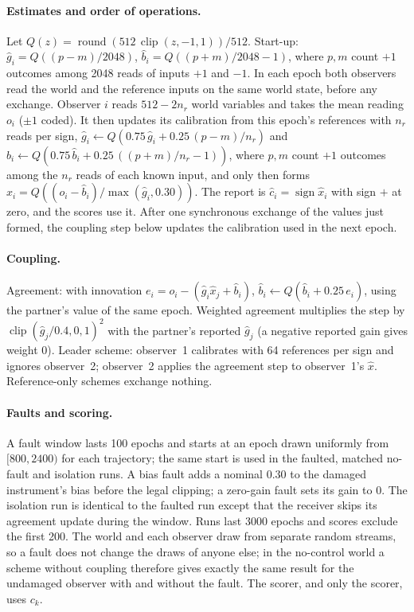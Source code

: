 \paragraph{Estimates and order of operations.} Let $Q(z)=\operatorname{round}(512\,\operatorname{clip}(z,-1,1))/512$. Start-up: $\hat g_i=Q((p-m)/2048)$, $\hat b_i=Q((p+m)/2048-1)$, where $p,m$ count $+1$ outcomes among 2048 reads of inputs $+1$ and $-1$. In each epoch both observers read the world and the reference inputs on the same world state, before any exchange. Observer $i$ reads $512-2n_r$ world variables and takes the mean reading $o_i$ ($\pm1$ coded). It then updates its calibration from this epoch's references with $n_r$ reads per sign, $\hat g_i\leftarrow Q(0.75\,\hat g_i+0.25\,(p-m)/n_r)$ and $\hat b_i\leftarrow Q(0.75\,\hat b_i+0.25\,((p+m)/n_r-1))$, where $p,m$ count $+1$ outcomes among the $n_r$ reads of each known input, and only then forms $\hat x_i=Q((o_i-\hat b_i)/\max(\hat g_i,0.30))$. The report is $\hat c_i=\operatorname{sign}\hat x_i$ with sign $+$ at zero, and the scores use it. After one synchronous exchange of the values just formed, the coupling step below updates the calibration used in the next epoch.

\paragraph{Coupling.} Agreement: with innovation $e_i=o_i-(\hat g_i\hat x_j+\hat b_i)$, $\hat b_i\leftarrow Q(\hat b_i+0.25\,e_i)$, using the partner's value of the same epoch. Weighted agreement multiplies the step by $\operatorname{clip}(\hat g_j/0.4,0,1)^2$ with the partner's reported $\hat g_j$ (a negative reported gain gives weight $0$). Leader scheme: observer~1 calibrates with 64 references per sign and ignores observer~2; observer~2 applies the agreement step to observer~1's $\hat x$. Reference-only schemes exchange nothing.

\paragraph{Faults and scoring.} A fault window lasts 100 epochs and starts at an epoch drawn uniformly from $[800,2400)$ for each trajectory; the same start is used in the faulted, matched no-fault and isolation runs. A bias fault adds a nominal $0.30$ to the damaged instrument's bias before the legal clipping; a zero-gain fault sets its gain to $0$. The isolation run is identical to the faulted run except that the receiver skips its agreement update during the window. Runs last 3000 epochs and scores exclude the first 200. The world and each observer draw from separate random streams, so a fault does not change the draws of anyone else; in the no-control world a scheme without coupling therefore gives exactly the same result for the undamaged observer with and without the fault. The scorer, and only the scorer, uses $c_k$.

